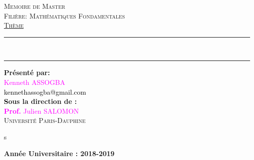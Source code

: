 \begin{titlepage}
\begin{center}

\begin{center}
\textsc{Memoire de Master}\\
\vspace{0.5cm}
\textsc{Filière: Mathématiques Fondamentales}\\
\vspace{1.2cm}
\textsc{\underline{Thème}}\\
\vspace{0.8cm}
\end{center}

\rule{\linewidth}{1mm}\\
\begin{center}
\textsc{\textbf{ \color{blue}{Schémas monotones discrets pour l'équation de Schrödinger}}}
\end{center}
\rule{\linewidth}{1mm}
\vspace{1cm}
\begin{flushright}
\textbf{Présenté par:}\\
\vspace{0.2cm}
\textcolor{magenta}{Kenneth ASSOGBA}\\
\textcolor{black}{kennethassogba@gmail.com}\\
\vspace{1cm}
\textbf{\textcolor{black}Sous la direction de :}\\
\vspace{0.2cm}
\textcolor{magenta}{\textbf{Prof.} Julien SALOMON}\\
\textsc{Université Paris-Dauphine}\\
\vspace{0.2cm}
\end{flushright}
\vspace{2cm}
s
\vspace{4cm}
\begin{center}
\noindent \textbf{Année Universitaire : 2018-2019}
\end{center}
\end{center}
\end{titlepage}